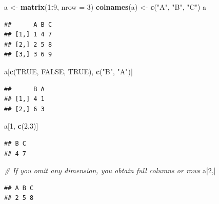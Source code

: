 \documentclass[]{book}
\newenvironment{Shaded}{\begin{snugshade}}{\end{snugshade}}
\newcommand{\CommentTok}[1]{\textcolor[rgb]{0.56,0.35,0.01}{\textit{#1}}}
\newcommand{\DataTypeTok}[1]{\textcolor[rgb]{0.13,0.29,0.53}{#1}}
\newcommand{\DecValTok}[1]{\textcolor[rgb]{0.00,0.00,0.81}{#1}}
\newcommand{\KeywordTok}[1]{\textcolor[rgb]{0.13,0.29,0.53}{\textbf{#1}}}
\newcommand{\NormalTok}[1]{#1}
\newcommand{\OperatorTok}[1]{\textcolor[rgb]{0.81,0.36,0.00}{\textbf{#1}}}
\newcommand{\OtherTok}[1]{\textcolor[rgb]{0.56,0.35,0.01}{#1}}
\newcommand{\StringTok}[1]{\textcolor[rgb]{0.31,0.60,0.02}{#1}}
\begin{document}
\begin{Shaded}
\begin{Highlighting}[]
\NormalTok{a <-}\StringTok{ }\KeywordTok{matrix}\NormalTok{(}\DecValTok{1}\OperatorTok{:}\DecValTok{9}\NormalTok{, }\DataTypeTok{nrow =} \DecValTok{3}\NormalTok{)}
\KeywordTok{colnames}\NormalTok{(a) <-}\StringTok{ }\KeywordTok{c}\NormalTok{(}\StringTok{"A"}\NormalTok{, }\StringTok{"B"}\NormalTok{, }\StringTok{"C"}\NormalTok{)}
\NormalTok{a}
\end{Highlighting}
\end{Shaded}

\begin{verbatim}
##      A B C
## [1,] 1 4 7
## [2,] 2 5 8
## [3,] 3 6 9
\end{verbatim}

\begin{Shaded}
\begin{Highlighting}[]
\NormalTok{a[}\KeywordTok{c}\NormalTok{(}\OtherTok{TRUE}\NormalTok{, }\OtherTok{FALSE}\NormalTok{, }\OtherTok{TRUE}\NormalTok{), }\KeywordTok{c}\NormalTok{(}\StringTok{"B"}\NormalTok{, }\StringTok{"A"}\NormalTok{)]}
\end{Highlighting}
\end{Shaded}

\begin{verbatim}
##      B A
## [1,] 4 1
## [2,] 6 3
\end{verbatim}

\begin{Shaded}
\begin{Highlighting}[]
\NormalTok{a[}\DecValTok{1}\NormalTok{, }\KeywordTok{c}\NormalTok{(}\DecValTok{2}\NormalTok{,}\DecValTok{3}\NormalTok{)]}
\end{Highlighting}
\end{Shaded}

\begin{verbatim}
## B C 
## 4 7
\end{verbatim}

\begin{Shaded}
\begin{Highlighting}[]
\CommentTok{# If you omit any dimension, you obtain full columns or rows}
\NormalTok{a[}\DecValTok{2}\NormalTok{,]}
\end{Highlighting}
\end{Shaded}

\begin{verbatim}
## A B C 
## 2 5 8
\end{verbatim}
\end{document}
